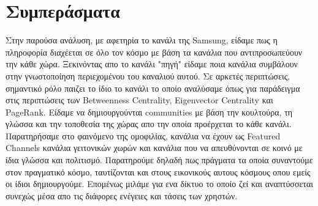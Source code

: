 \documentclass[12pt]{article}
\begin{document}
	
	
	\newpage
	\section{Συμπεράσματα}
	Στην παρούσα ανάλυση, με αφετηρία το κανάλι της Samsung, είδαμε πως η πληροφορία διαχέεται σε όλο τον κόσμο με βάση τα κανάλια που αντιπροσωπεύουν την κάθε χώρα. Ξεκινόντας απο το κανάλι "πηγή" είδαμε ποια κανάλια συμβάλουν στην γνωστοποίηση περιεχομένου του καναλιού αυτού. Σε αρκετές περιπτώσεις, σημαντικό ρόλο παιζει το ίδιο το κανάλι το οποίο αναλύσαμε όπως για παράδειγμα στις περιπτώσεις των Betweenness Centrality, Eigenvector Centrality και PageRank. Είδαμε να δημιουργούνται communities με βάση την κουλτούρα, τη γλώσσα και την τοποθεσία της χώρας απο την οποία προέρχεται το κάθε κανάλι. Παρατηρήσαμε στο φαινόμενο της ομοφιλίας, κανάλια να έχουν ως Featured Channels κανάλια γειτονικών χωρών και κανάλια που να απευθύνονται σε κοινό με ίδια γλώσσα και πολιτισμό. Παρατηρούμε δηλαδή πως πράγματα τα οποία συναντούμε στον πραγματικό κόσμο, ταυτίζονται και στους εικονικούς αυτους κόσμους οπου εμείς οι ίδιοι δημιουργούμε. Επομένως μιλάμε για ενα δίκτυο το οποίο ζεί και αναπτύσσεται συνεχώς μέσα απο τις διάφορες ενέγειες και τάσεις των χρηστών.	
	\label{chap:simperasmata_14}	
\end{document}
